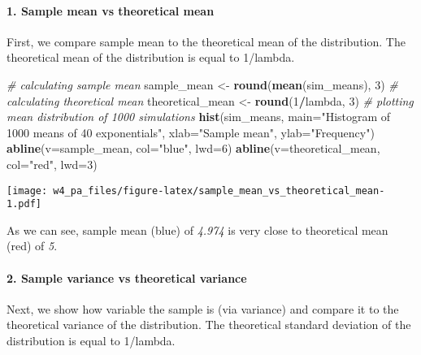 \documentclass[]{article}
\newenvironment{Shaded}{\begin{snugshade}}{\end{snugshade}}
\newcommand{\CommentTok}[1]{\textcolor[rgb]{0.56,0.35,0.01}{\textit{#1}}}
\newcommand{\DataTypeTok}[1]{\textcolor[rgb]{0.13,0.29,0.53}{#1}}
\newcommand{\DecValTok}[1]{\textcolor[rgb]{0.00,0.00,0.81}{#1}}
\newcommand{\KeywordTok}[1]{\textcolor[rgb]{0.13,0.29,0.53}{\textbf{#1}}}
\newcommand{\NormalTok}[1]{#1}
\newcommand{\OperatorTok}[1]{\textcolor[rgb]{0.81,0.36,0.00}{\textbf{#1}}}
\newcommand{\StringTok}[1]{\textcolor[rgb]{0.31,0.60,0.02}{#1}}
\let\oldparagraph\paragraph
\renewcommand{\paragraph}[1]{\oldparagraph{#1}\mbox{}}
\begin{document}
\hypertarget{sample-mean-vs-theoretical-mean}{%
\paragraph{1. Sample mean vs theoretical
mean}\label{sample-mean-vs-theoretical-mean}}

First, we compare sample mean to the theoretical mean of the
distribution. The theoretical mean of the distribution is equal to
1/lambda.

\begin{Shaded}
\begin{Highlighting}[]
\CommentTok{# calculating sample mean}
\NormalTok{sample_mean <-}\StringTok{ }\KeywordTok{round}\NormalTok{(}\KeywordTok{mean}\NormalTok{(sim_means), }\DecValTok{3}\NormalTok{)}
\CommentTok{# calculating theoretical mean}
\NormalTok{theoretical_mean <-}\StringTok{ }\KeywordTok{round}\NormalTok{(}\DecValTok{1}\OperatorTok{/}\NormalTok{lambda, }\DecValTok{3}\NormalTok{)}
\CommentTok{# plotting mean distribution of 1000 simulations }
\KeywordTok{hist}\NormalTok{(sim_means, }\DataTypeTok{main=}\StringTok{"Histogram of 1000 means of 40 exponentials"}\NormalTok{, }\DataTypeTok{xlab=}\StringTok{"Sample mean"}\NormalTok{,}
     \DataTypeTok{ylab=}\StringTok{"Frequency"}\NormalTok{)}
\KeywordTok{abline}\NormalTok{(}\DataTypeTok{v=}\NormalTok{sample_mean, }\DataTypeTok{col=}\StringTok{"blue"}\NormalTok{, }\DataTypeTok{lwd=}\DecValTok{6}\NormalTok{)}
\KeywordTok{abline}\NormalTok{(}\DataTypeTok{v=}\NormalTok{theoretical_mean, }\DataTypeTok{col=}\StringTok{"red"}\NormalTok{, }\DataTypeTok{lwd=}\DecValTok{3}\NormalTok{)}
\end{Highlighting}
\end{Shaded}

\texttt{[image: w4\_pa\_files/figure-latex/sample\_mean\_vs\_theoretical\_mean-1.pdf]}

As we can see, sample mean (blue) of \emph{4.974} is very close to
theoretical mean (red) of \emph{5}.

\hypertarget{sample-variance-vs-theoretical-variance}{%
\paragraph{2. Sample variance vs theoretical
variance}\label{sample-variance-vs-theoretical-variance}}

Next, we show how variable the sample is (via variance) and compare it
to the theoretical variance of the distribution. The theoretical
standard deviation of the distribution is equal to 1/lambda.
\end{document}
